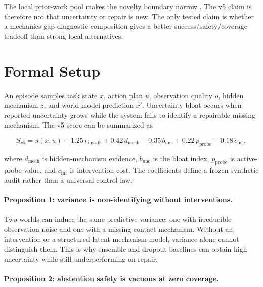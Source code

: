 \documentclass{article}
\begin{document}
The local prior-work pool makes the novelty boundary narrow \citep{pool88_21,pool88_22,pool88_23,pool88_24,pool88_25,pool88_26,pool88_27,pool88_28,pool88_29,pool88_30,pool88_31,pool88_32,pool88_33,pool88_34,pool88_35,pool88_36,pool88_37,pool88_38,pool88_39,pool88_40,pool88_41,pool88_42,pool88_43,pool88_44,pool88_45,pool88_46,pool88_47,pool88_48,pool88_49,pool88_50,pool88_51,pool88_52,pool88_53,pool88_54,pool88_55,pool88_56}. The v5 claim is therefore not that uncertainty or repair is new. The only tested claim is whether a mechanics-gap diagnostic composition gives a better success/safety/coverage tradeoff than strong local alternatives.

\section{Formal Setup}

An episode samples task state $x$, action plan $u$, observation quality $o$, hidden mechanism $z$, and world-model prediction $\hat x'$. Uncertainty bloat occurs when reported uncertainty grows while the system fails to identify a repairable missing mechanism. The v5 score can be summarized as

\begin{equation}S_{v5}=s(x,u)-1.25\,r_{\mathrm{unsafe}}+0.42\,d_{\mathrm{mech}}-0.35\,b_{\mathrm{unc}}+0.22\,p_{\mathrm{probe}}-0.18\,c_{\mathrm{int}},\end{equation}

where $d_{\mathrm{mech}}$ is hidden-mechanism evidence, $b_{\mathrm{unc}}$ is the bloat index, $p_{\mathrm{probe}}$ is active-probe value, and $c_{\mathrm{int}}$ is intervention cost. The coefficients define a frozen synthetic audit rather than a universal control law.

\paragraph{Proposition 1: variance is non-identifying without interventions.}

Two worlds can induce the same predictive variance: one with irreducible observation noise and one with a missing contact mechanism. Without an intervention or a structured latent-mechanism model, variance alone cannot distinguish them. This is why ensemble and dropout baselines can obtain high uncertainty while still underperforming on repair.

\paragraph{Proposition 2: abstention safety is vacuous at zero coverage.}
\end{document}
